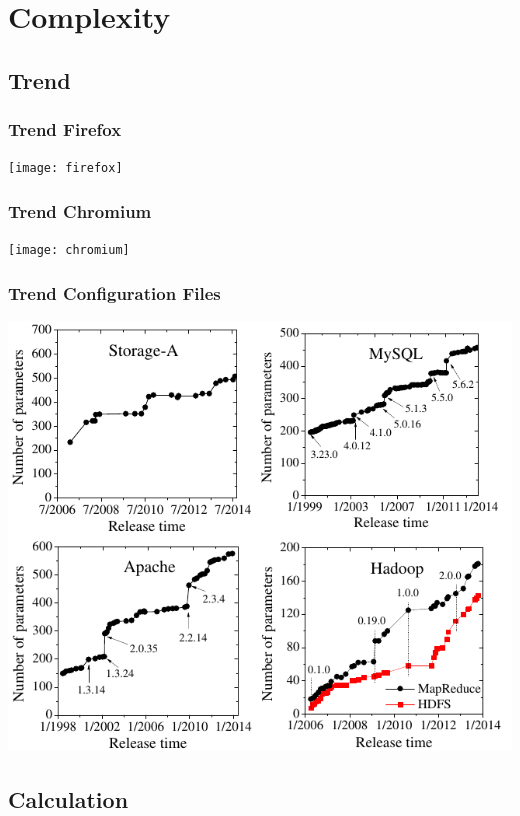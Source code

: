 \section{Complexity}

\subsection{Trend}

\begin{frame}
	\frametitle{Trend Firefox}
	\texttt{[image: firefox]}
\end{frame}

\begin{frame}
	\frametitle{Trend Chromium}
	\texttt{[image: chromium]}
\end{frame}

\begin{frame}
	\frametitle{Trend Configuration Files}
	\includegraphics[scale=0.5]{pics/trend.png}
	\citet{xu2015hey}
\end{frame}

\subsection{Calculation}

